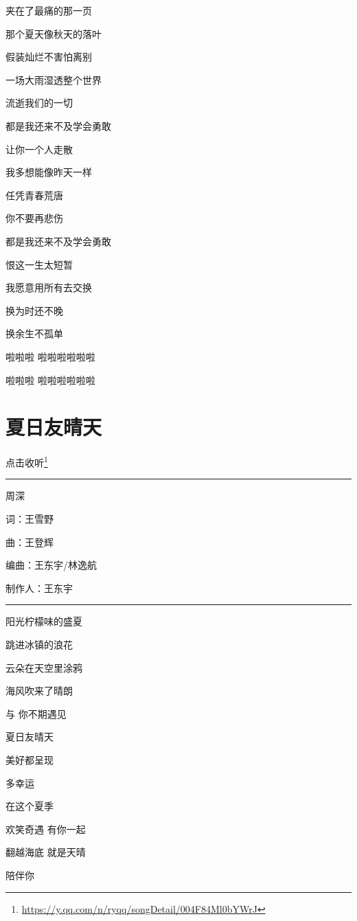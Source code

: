 \documentclass[]{ctexbook}
\renewcommand{\href}[2]{#2\footnote{\url{#1}}}
\begin{document}
夹在了最痛的那一页

那个夏天像秋天的落叶

假装灿烂不害怕离别

一场大雨湿透整个世界

流逝我们的一切

都是我还来不及学会勇敢

让你一个人走散

我多想能像昨天一样

任凭青春荒唐

你不要再悲伤

都是我还来不及学会勇敢

恨这一生太短暂

我愿意用所有去交换

换为时还不晚

换余生不孤单

啦啦啦 啦啦啦啦啦啦

啦啦啦 啦啦啦啦啦啦

\section*{夏日友晴天}\label{sunny-day-in-summer}


\href{https://y.qq.com/n/ryqq/songDetail/004F84Ml0bYWrJ}{点击收听}

\begin{center}\rule{0.5\linewidth}{0.5pt}\end{center}

周深

词：王雪野

曲：王登辉

编曲：王东宇/林逸航

制作人：王东宇

\begin{center}\rule{0.5\linewidth}{0.5pt}\end{center}

阳光柠檬味的盛夏

跳进冰镇的浪花

云朵在天空里涂鸦

海风吹来了晴朗

与 你不期遇见

夏日友晴天

美好都呈现

多幸运

在这个夏季

欢笑奇遇 有你一起

翻越海底 就是天晴

陪伴你
\end{document}
